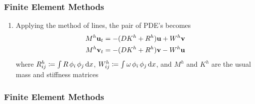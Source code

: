 \begin{frame}
\frametitle{Finite Element Methods}
\begin{enumerate}
    \item Applying the method of lines, the pair of PDE's becomes
    \begin{align*}
        M^h \mathbf{u}_t &= -(D K^h + R^h) \mathbf{u} + W^h \mathbf{v} \\
        M^h \mathbf{v}_t &= -(D K^h + R^h) \mathbf{v} - W^h \mathbf{u}
    \end{align*}
    where $R^h_{ij} \coloneqq \int R \,\phi_i \,\phi_j \operatorname{d}\!{x}$, $W^h_{ij} \coloneqq \int \omega \,\phi_i \,\phi_j \operatorname{d}\!{x}$, and $M^h$ and $K^h$ are the usual mass and stiffness matrices
\end{enumerate}
\end{frame}
\frametitle{Finite Element Methods}
